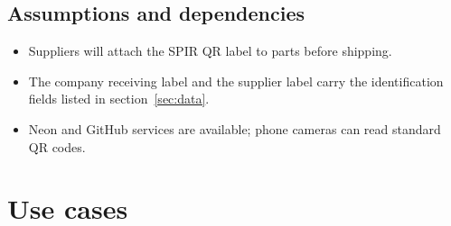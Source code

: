 \documentclass[11pt,a4paper]{article}
\begin{document}
\subsection{Assumptions and dependencies}
\begin{itemize}
  \item Suppliers will attach the SPIR QR label to parts before shipping.
  \item The company receiving label and the supplier label carry the identification fields listed in section~\ref{sec:data}.
  \item Neon and GitHub services are available; phone cameras can read standard QR codes.
\end{itemize}

\section{Use cases}
\end{document}

